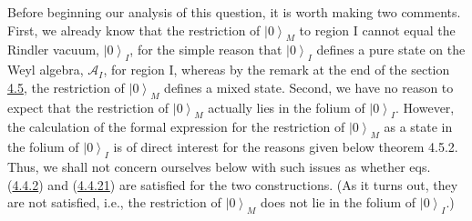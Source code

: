 \documentclass[11pt,a4paper]{article}
\providecommand{\ket}[1]{\left\lvert#1\right\rangle}
\begin{document}
Before beginning our analysis of this question, it is worth \hypertarget{source-121}{} making two comments. First, we already know that the restriction of \(\ket{0}_M\) to region I cannot equal the Rindler vacuum, \(\ket{0}_I\), for the simple reason that \(\ket{0}_I\) defines a pure state on the Weyl algebra, \(\mathcal{A}_I\), for region I, whereas by the remark at the end of the section \hyperlink{sec:4.5}{4.5}, the restriction of \(\ket{0}_M\) defines a mixed state. Second, we have no reason to expect that the restriction of \(\ket{0}_M\) actually lies in the folium of \(\ket{0}_I\). However, the calculation of the formal expression for the restriction of \(\ket{0}_M\) as a state in the folium of \(\ket{0}_I\) is of direct interest for the reasons given below theorem 4.5.2. Thus, we shall not concern ourselves below with such issues as whether eqs. (\hyperref[eq:4.4.2]{4.4.2}) and (\hyperref[eq:4.4.21]{4.4.21}) are satisfied for the two constructions. (As it turns out, they are not satisfied, i.e., the restriction of \(\ket{0}_M\) does not lie in the folium of \(\ket{0}_I\).)
\end{document}
